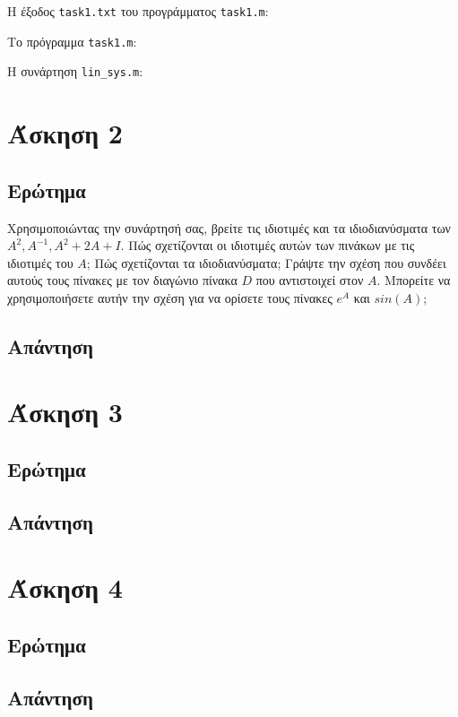 \documentclass[12pt, fleqn, leqno]{extreport}
\begin{document}
Η έξοδος \lstinline[language={}]{task1.txt} του προγράμματος \lstinline[language={}]{task1.m}:


\newpage
Το πρόγραμμα \lstinline[language={}]{task1.m}:


\newpage
Η συνάρτηση \lstinline[language={}]{lin_sys.m}:



\chapter{Άσκηση 2}

\section{Ερώτημα}
Χρησιμοποιώντας την συνάρτησή σας, βρείτε τις ιδιοτιμές και τα ιδιοδιανύσματα των $A^{2}, A^{-1}, A^{2}+2A+I$. Πώς σχετίζονται οι ιδιοτιμές αυτών των πινάκων με τις ιδιοτιμές του $Α$; Πώς σχετίζονται τα ιδιοδιανύσματα; Γράψτε την σχέση που συνδέει αυτούς τους πίνακες με τον διαγώνιο πίνακα $D$ που αντιστοιχεί στον $Α$. Μπορείτε να χρησιμοποιήσετε αυτήν την σχέση για να ορίσετε τους πίνακες $e^A$ και $sin(A)$; 


\newpage
\section{Απάντηση}

\chapter{Άσκηση 3}
\section{Ερώτημα}

\newpage
\section{Απάντηση}

\chapter{Άσκηση 4}
\section{Ερώτημα}

\newpage
\section{Απάντηση}
\end{document}
